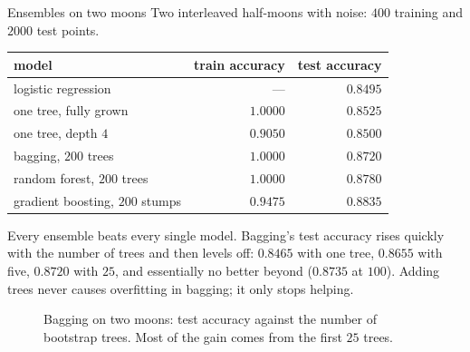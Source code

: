 \begin{workedexample}{Ensembles on two moons}
Two interleaved half-moons with noise: $400$ training and $2000$ test points.

\begin{center}
\small
\renewcommand{\arraystretch}{1.12}
\begin{tabular}{@{}lrr@{}}
\toprule
model & train accuracy & test accuracy\\
\midrule
logistic regression          & --- & $0.8495$\\
one tree, fully grown        & $1.0000$ & $0.8525$\\
one tree, depth $4$          & $0.9050$ & $0.8500$\\
bagging, $200$ trees         & $1.0000$ & $0.8720$\\
random forest, $200$ trees   & $1.0000$ & $0.8780$\\
gradient boosting, $200$ stumps & $0.9475$ & $\mathbf{0.8835}$\\
\bottomrule
\end{tabular}
\end{center}

Every ensemble beats every single model. Bagging's test accuracy rises quickly
with the number of trees and then levels off: $0.8465$ with one tree, $0.8655$
with five, $0.8720$ with $25$, and essentially no better beyond ($0.8735$ at
$100$). Adding trees never causes overfitting in bagging; it only stops helping.
\end{workedexample}

\begin{figure}[htbp]
  \centering
  \caption{Bagging on two moons: test accuracy against the number of bootstrap
  trees. Most of the gain comes from the first $25$ trees.}
  \label{fig:bagging-B}
\end{figure}

